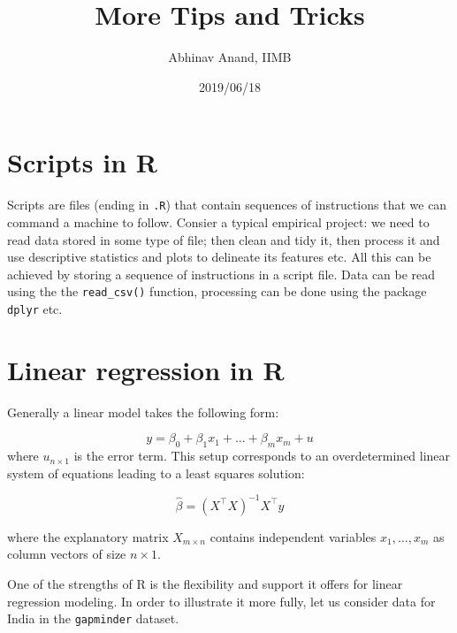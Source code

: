 \documentclass[12pt,]{article}
\title{More Tips and Tricks}
\author{Abhinav Anand, IIMB}
\date{2019/06/18}
\newenvironment{Shaded}{\begin{snugshade}}{\end{snugshade}}
\newcommand{\KeywordTok}[1]{\textcolor[rgb]{0.13,0.29,0.53}{\textbf{#1}}}
\newcommand{\StringTok}[1]{\textcolor[rgb]{0.31,0.60,0.02}{#1}}
\newcommand{\OperatorTok}[1]{\textcolor[rgb]{0.81,0.36,0.00}{\textbf{#1}}}
\newcommand{\NormalTok}[1]{#1}
\begin{document}
\maketitle

\section{Scripts in R}\label{scripts-in-r}

Scripts are files (ending in \texttt{.R}) that contain sequences of
instructions that we can command a machine to follow. Consier a typical
empirical project: we need to read data stored in some type of file;
then clean and tidy it, then process it and use descriptive statistics
and plots to delineate its features etc. All this can be achieved by
storing a sequence of instructions in a script file. Data can be read
using the the \texttt{read\_csv()} function, processing can be done
using the package \texttt{dplyr} etc.

\section{Linear regression in R}\label{linear-regression-in-r}

Generally a linear model takes the following form:

\[
y = \beta_0 + \beta_1x_1 + \hdots + \beta_mx_m + u
\] where \(u_{n\times 1}\) is the error term. This setup corresponds to
an overdetermined linear system of equations leading to a least squares
solution:

\[
\hat{\beta} = (X^{\top} X)^{-1} X^{\top}y 
\]

where the explanatory matrix \(X_{m\times n}\) contains independent
variables \(x_1,\hdots,x_m\) as column vectors of size \(n\times 1\).

One of the strengths of R is the flexibility and support it offers for
linear regression modeling. In order to illustrate it more fully, let us
consider data for India in the \texttt{gapminder} dataset.

\begin{Shaded}
\end{Shaded}
\end{document}
